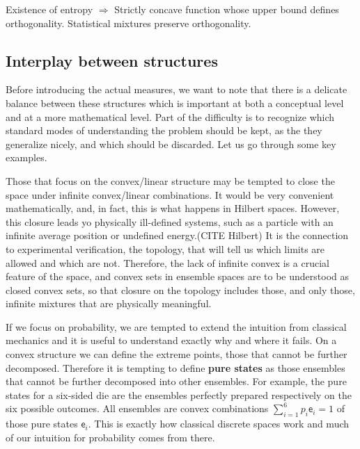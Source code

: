 \documentclass[10pt,twocolumn, nofootinbib]{revtex4-2}
\newcommand{\ens}[1][e] {\mathsf{#1}} %
\begin{document}
\begin{tcolorbox}[colback=white, colframe=black]
	Existence of entropy $\Rightarrow$ Strictly concave function whose upper bound defines orthogonality. Statistical mixtures preserve orthogonality.
\end{tcolorbox}

\subsection{Interplay between structures}

Before introducing the actual measures, we want to note that there is a delicate balance between these structures which is important at both a conceptual level and at a more mathematical level. Part of the difficulty is to recognize which standard modes of understanding the problem should be kept, as the they generalize nicely, and which should be discarded. Let us go through some key examples.

Those that focus on the convex/linear structure may be tempted to close the space under infinite convex/linear combinations. It would be very convenient mathematically, and, in fact, this is what happens in Hilbert spaces. However, this closure leads yo physically ill-defined systems, such as a particle with an infinite average position or undefined energy.(CITE Hilbert) It is the connection to experimental verification, the topology, that will tell us which limits are allowed and which are not. Therefore, the lack of infinite convex is a crucial feature of the space, and convex sets in ensemble spaces are to be understood as closed convex sets, so that closure on the topology includes those, and only those, infinite mixtures that are physically meaningful.

If we focus on probability, we are tempted to extend the intuition from classical mechanics and it is useful to understand exactly why and where it fails. On a convex structure we can define the extreme points, those that cannot be further decomposed. Therefore it is tempting to define \textbf{pure states} as those ensembles that cannot be further decomposed into other ensembles. For example, the pure states for a six-sided die are the ensembles perfectly prepared respectively on the six possible outcomes. All ensembles are convex combinations $\sum_{i=1}^{6} p_i \ens_i = 1$ of those pure states $\ens_i$. This is exactly how classical discrete spaces work and much of our intuition for probability comes from there.
\end{document}
